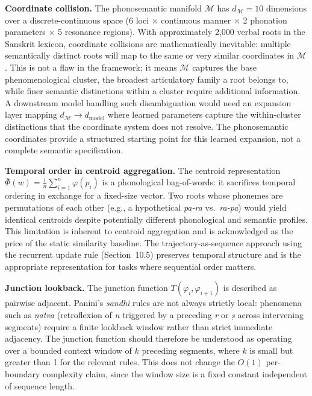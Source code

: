 \documentclass[12pt]{article}
\begin{document}
\textbf{Coordinate collision.} The phonosemantic manifold $\mathcal{M}$ has $d_\mathcal{M} = 10$ dimensions over a discrete-continuous space (6 loci $\times$ continuous manner $\times$ 2 phonation parameters $\times$ 5 resonance regions). With approximately 2,000 verbal roots in the Sanskrit lexicon, coordinate collisions are mathematically inevitable: multiple semantically distinct roots will map to the same or very similar coordinates in $\mathcal{M}$. This is not a flaw in the framework; it means $\mathcal{M}$ captures the base phenomenological cluster, the broadest articulatory family a root belongs to, while finer semantic distinctions within a cluster require additional information. A downstream model handling such disambiguation would need an expansion layer mapping $d_\mathcal{M} \to d_\text{model}$ where learned parameters capture the within-cluster distinctions that the coordinate system does not resolve. The phonosemantic coordinates provide a structured starting point for this learned expansion, not a complete semantic specification.

\textbf{Temporal order in centroid aggregation.} The centroid representation $\bar{\Phi}(w) = \frac{1}{n}\sum_{i=1}^n \varphi(p_i)$ is a phonological bag-of-words: it sacrifices temporal ordering in exchange for a fixed-size vector. Two roots whose phonemes are permutations of each other (e.g., a hypothetical \textit{pa-ra} vs.~\textit{ra-pa}) would yield identical centroids despite potentially different phonological and semantic profiles. This limitation is inherent to centroid aggregation and is acknowledged as the price of the static similarity baseline. The trajectory-as-sequence approach using the recurrent update rule (Section~10.5) preserves temporal structure and is the appropriate representation for tasks where sequential order matters.

\textbf{Junction lookback.} The junction function $T(\varphi_i, \varphi_{i+1})$ is described as pairwise adjacent. Panini's \textit{sandhi} rules are not always strictly local: phenomena such as \textit{ṇatva} (retroflexion of \textit{n} triggered by a preceding \textit{r} or \textit{ṣ} across intervening segments) require a finite lookback window rather than strict immediate adjacency. The junction function should therefore be understood as operating over a bounded context window of $k$ preceding segments, where $k$ is small but greater than 1 for the relevant rules. This does not change the $O(1)$ per-boundary complexity claim, since the window size is a fixed constant independent of sequence length.
\end{document}
